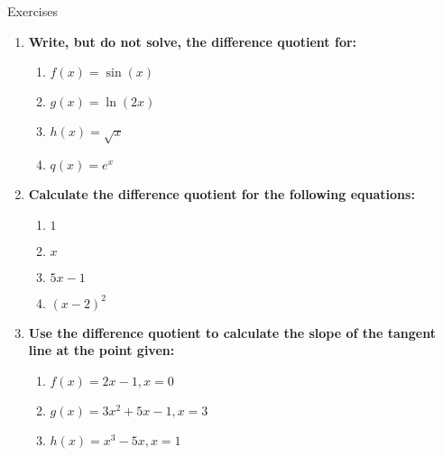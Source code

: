 \documentclass[../revisedmain.tex]{subfiles}
\begin{document}
	\begin{center}
		{\Large Exercises}
	\end{center}
	\begin{enumerate}
		\item \textbf{Write, but do not solve, the difference quotient for:}
		\begin{enumerate}
			\item \(f(x)=\sin(x)\)
			\item \(g(x)=\ln(2x)\)
			\item \(h(x)=\sqrt{x}\)
			\item \(q(x)=e^{x}\)
		\end{enumerate}
		\item \textbf{Calculate the difference quotient for the following equations:}
		\begin{enumerate}
			\item \(1\)
			\item \(x\)
			\item \(5x-1\)
			\item \((x-2)^2\)
		\end{enumerate}
		\item \textbf{Use the difference quotient to calculate the slope of the tangent line at the point given:}
		\begin{enumerate}
			\item \(f(x)=2x-1, x=0\)
			\item \(g(x)=3x^2+5x-1, x=3\)
			\item \(h(x)=x^3-5x, x=1\)
		\end{enumerate}
	\end{enumerate}
\end{document}
